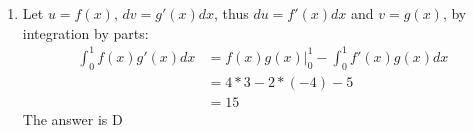 \documentclass{article}
\numberwithin{equation}{section}
\begin{document}
\begin{enumerate}
    \item Let $u = f(x)$, $dv = g'(x) dx$, thus $du = f'(x)dx$ and $v = g(x)$, by integration by parts:
    \begin{align*}
        \int_{0}^{1} f(x)g'(x)dx &= f(x)g(x)\Big|_0^1 - \int_{0}^{1} f'(x)g(x) dx\\
        &= 4*3 - 2*(-4) - 5\\
        &= 15
    \end{align*}
    The answer is D
\end{enumerate}
\end{document}
